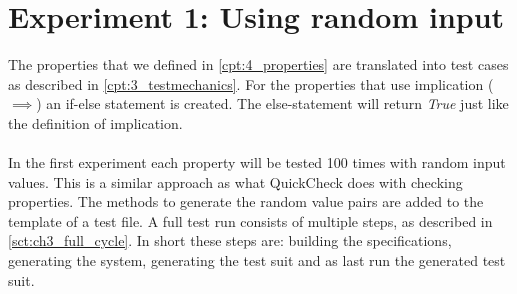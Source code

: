 \chapter{Experiment 1: Using random input}
\label{chp:experiment1}

The properties that we defined in \autoref{cpt:4_properties} are translated into test cases as described in \autoref{cpt:3_testmechanics}. For the properties that use implication ($\implies$) an if-else statement is created. The else-statement will return \textit{True} just like the definition of implication.\\
\\
In the first experiment each property will be tested 100 times with random input values. This is a similar approach as what QuickCheck does with checking properties. The methods to generate the random value pairs are added to the template of a test file. A full test run consists of multiple steps, as described in \autoref{sct:ch3_full_cycle}. In short these steps are: building the specifications, generating the system, generating the test suit and as last run the generated test suit.

